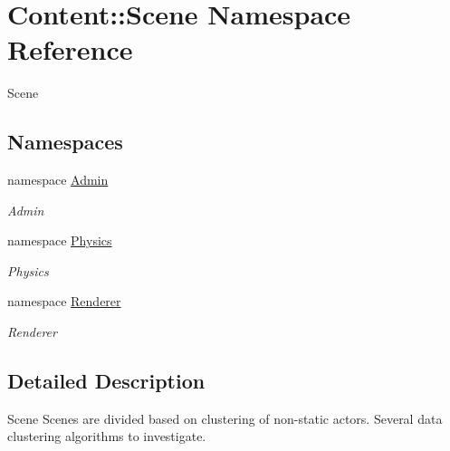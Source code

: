 \hypertarget{namespaceContent_1_1Scene}{
\section{Content::Scene Namespace Reference}
\label{namespaceContent_1_1Scene}
}


Scene  
\subsection*{Namespaces}
\begin{DoxyCompactItemize}
\item 
namespace \hyperlink{namespaceContent_1_1Scene_1_1Admin}{Admin}


\begin{DoxyCompactList}\small\item\em Admin \item\end{DoxyCompactList}\item 
namespace \hyperlink{namespaceContent_1_1Scene_1_1Physics}{Physics}


\begin{DoxyCompactList}\small\item\em Physics \item\end{DoxyCompactList}\item 
namespace \hyperlink{namespaceContent_1_1Scene_1_1Renderer}{Renderer}


\begin{DoxyCompactList}\small\item\em Renderer \item\end{DoxyCompactList}\end{DoxyCompactItemize}


\subsection{Detailed Description}
Scene Scenes are divided based on clustering of non-\/static actors. Several data clustering algorithms to investigate. 